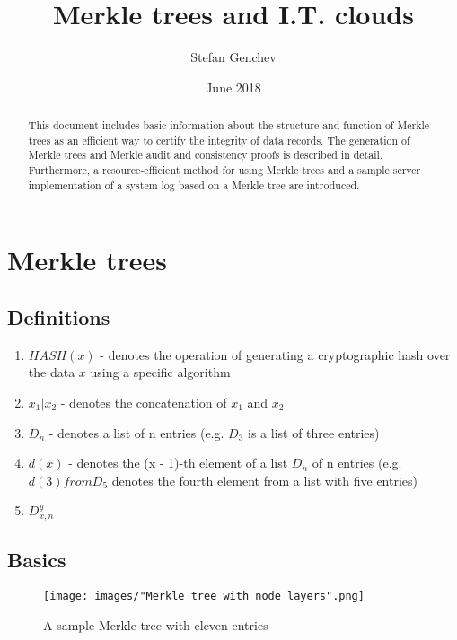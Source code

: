 \documentclass{article}
\title{Merkle trees and I.T. clouds}
\author{Stefan Genchev}
\date{June 2018}
\begin{document}
\maketitle

\begin{abstract}
	This document includes basic information about the structure and function of Merkle trees as an efficient way to certify the integrity of data records. The generation of Merkle trees and Merkle audit and consistency proofs is described in detail. Furthermore, a resource-efficient method for using Merkle trees and a sample server implementation of a system log based on a Merkle tree are introduced.
\end{abstract}

\tableofcontents 

\section{Merkle trees}
	
	\subsection{Definitions}
		\begin{enumerate}
			\item $ HASH(x) $ - denotes the operation of generating a cryptographic hash over the data $ x $ using a specific algorithm
			\item $ x_{1} | x_{2} $ - denotes the concatenation of $ x_{1} $ and $ x_{2} $
			\item $ D_{n} $ - denotes a list of n entries (e.g. $ D_{3} $ is a list of three entries)
			\item $ d(x) $ - denotes the (x - 1)-th element of a list $ D_{n} $ of n entries (e.g. $ d(3) from D_{5} $ denotes the fourth element from a list with five entries)
			\item $ D_{x, n}^{y} $
		\end{enumerate}
	
	\subsection{Basics}
	
	\begin{figure}[H]
		\caption{A sample Merkle tree with eleven entries}
		\texttt{[image: images/"Merkle tree with node layers".png]}
	\end{figure}
	
\end{document}
